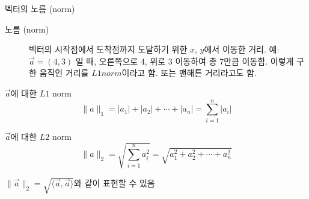 \documentclass[10pt,t]{beamer}
\begin{document}
\begin{frame}[fragile]{벡터의 노름 (norm)}
\begin{description}
    \item[노름 (norm)] 벡터의 시작점에서 도착점까지 도달하기 위한 $x$, $y$에서 이동한 거리. 예: $\vec{a} = (4,3)$ 일 때,  오른쪽으로 4, 위로 3 이동하여 총 7만큼 이동함. 이렇게 구한 움직인 거리를 $L1 norm$이라고 함. 또는 맨해튼 거리라고도 함.
\end{description}

\begin{block}{$\vec{a}$에 대한 $L1$ norm}
    \[\|a\|_1 = |a_1| +|a_2| + \cdots +|a_n| = \sum_{i=1}^n |a_i|     \]
    
\end{block}

\begin{block}{$\vec{a}$에 대한 $L2$ norm}
    \[\|a\|_2 =  \sqrt{\sum_{i=1}^n a_i^2} = \sqrt{a_1^2 +a_2^2 + \cdots +a_n^2}     \]
    
    $\| \vec{a}\|_2 = \sqrt{\langle \vec{a},\vec{a}\rangle }$와 같이 표현할 수 있음
\end{block}
\end{frame}
\end{document}
